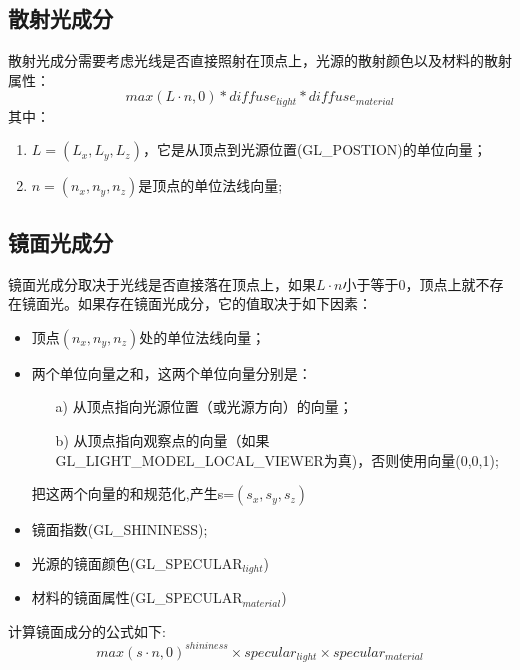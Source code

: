 \documentclass[a4paper,10pt]{article}
\begin{document}
\begin{CJK}{UTF8}{song}
\subsection{散射光成分}
散射光成分需要考虑光线是否直接照射在顶点上，光源的散射颜色以及材料的散射属性：
\begin{displaymath}
 max(L\cdot{}n,0)*diffuse_{light}*diffuse_{material}
\end{displaymath}
其中：
\begin{enumerate}
 \item $L=(L_x,L_y,L_z)$，它是从顶点到光源位置(GL\_POSTION)的单位向量；
 \item $n=(n_x,n_y,n_z)$是顶点的单位法线向量;
\end{enumerate}

\subsection{镜面光成分}
镜面光成分取决于光线是否直接落在顶点上，如果$L\cdot{}n$小于等于0，顶点上就不存在镜面光。如果存在镜面光成分，它的值取决于如下因素：
\begin{itemize}
 \item 顶点$(n_x,n_y,n_z)$处的单位法线向量；
 \item 两个单位向量之和，这两个单位向量分别是：
  \begin{itemize}
    \item[a)] 从顶点指向光源位置（或光源方向）的向量；
    \item[b)] 从顶点指向观察点的向量（如果GL\_LIGHT\_MODEL\_LOCAL\_VIEWER为真)，否则使用向量(0,0,1);
  \end{itemize}
把这两个向量的和规范化,产生s=$(s_x,s_y,s_z)$
\item 镜面指数(GL\_SHININESS);
\item 光源的镜面颜色(GL\_SPECULAR$_{light}$)
\item 材料的镜面属性(GL\_SPECULAR$_{material}$)
\end{itemize}
计算镜面成分的公式如下:
\begin{displaymath}
 max(s\cdot{}n,0)^{shininess}\times{}specular_{light}\times{}specular_{material}
\end{displaymath}


\end{CJK}
\end{document}

